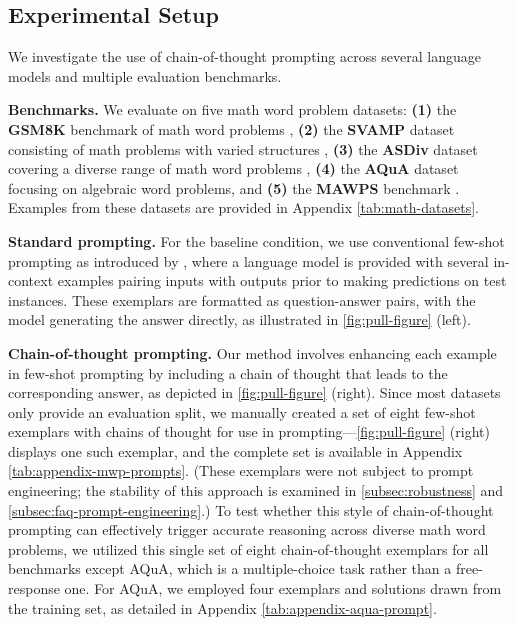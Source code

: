 \subsection{Experimental Setup}

We investigate the use of chain-of-thought prompting across several language models and multiple evaluation benchmarks.

\textbf{Benchmarks.}
We evaluate on five math word problem datasets:
\textbf{(1)} the \textbf{GSM8K} benchmark of math word problems \citep{cobbe2021training},
\textbf{(2)} the \textbf{SVAMP} dataset consisting of math problems with varied structures \citep{patel-etal-2021-nlp},
\textbf{(3)} the \textbf{ASDiv} dataset covering a diverse range of math word problems \citep{miao-etal-2020-diverse},
\textbf{(4)} the \textbf{AQuA} dataset focusing on algebraic word problems, and
\textbf{(5)} the \textbf{MAWPS} benchmark \citep{koncel-kedziorski-etal-2016-mawps}. Examples from these datasets are provided in Appendix \cref{tab:math-datasets}.

\textbf{Standard prompting.} For the baseline condition, we use conventional few-shot prompting as introduced by \citet{brown2020language}, where a language model is provided with several in-context examples pairing inputs with outputs prior to making predictions on test instances. These exemplars are formatted as question-answer pairs, with the model generating the answer directly, as illustrated in \cref{fig:pull-figure} (left).

\textbf{Chain-of-thought prompting.} Our method involves enhancing each example in few-shot prompting by including a chain of thought that leads to the corresponding answer, as depicted in \cref{fig:pull-figure} (right). Since most datasets only provide an evaluation split, we manually created a set of eight few-shot exemplars with chains of thought for use in prompting—\cref{fig:pull-figure} (right) displays one such exemplar, and the complete set is available in Appendix \cref{tab:appendix-mwp-prompts}. (These exemplars were not subject to prompt engineering; the stability of this approach is examined in \cref{subsec:robustness} and \cref{subsec:faq-prompt-engineering}.) To test whether this style of chain-of-thought prompting can effectively trigger accurate reasoning across diverse math word problems, we utilized this single set of eight chain-of-thought exemplars for all benchmarks except AQuA, which is a multiple-choice task rather than a free-response one. For AQuA, we employed four exemplars and solutions drawn from the training set, as detailed in Appendix \cref{tab:appendix-aqua-prompt}.

